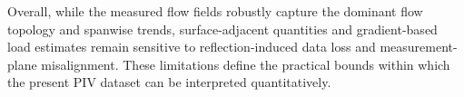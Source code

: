\documentclass[wes, manuscript]{copernicus}
\begin{document}
Overall, while the measured flow fields robustly capture the dominant flow topology and spanwise trends, surface-adjacent quantities and gradient-based load estimates remain sensitive to reflection-induced data loss and measurement-plane misalignment. These limitations define the practical bounds within which the present PIV dataset can be interpreted quantitatively.


\end{document}
